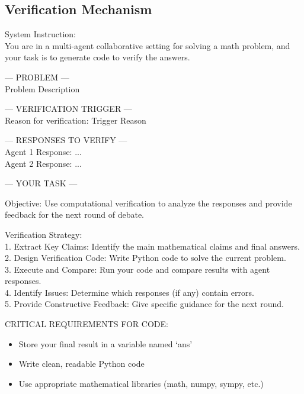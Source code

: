 \subsection{Verification Mechanism}
\label{app:prompt_verification}

\begin{tcolorbox}[
    breakable,
    colback=white,
    colframe=black,
    boxrule=0.8pt,
    left=6pt,
    right=6pt,
    top=6pt,
    bottom=6pt
]
\ttfamily\small
System Instruction:\\
You are in a multi-agent collaborative setting for solving a math problem, and your task is to generate code to verify the answers.

\vspace{0.5em}
--- PROBLEM --- \\
\lbrack Problem Description\rbrack

\vspace{0.5em}
--- VERIFICATION TRIGGER --- \\
Reason for verification: \lbrack Trigger Reason\rbrack

\vspace{0.5em}
--- RESPONSES TO VERIFY --- \\
Agent 1 Response: ...\\
Agent 2 Response: ...

\vspace{0.5em}
--- YOUR TASK ---

\vspace{0.25em}
Objective: Use computational verification to analyze the responses and provide feedback for the next round of debate.

\vspace{0.25em}
Verification Strategy:\\
1. Extract Key Claims: Identify the main mathematical claims and final answers.\\
2. Design Verification Code: Write Python code to solve the current problem.\\
3. Execute and Compare: Run your code and compare results with agent responses.\\
4. Identify Issues: Determine which responses (if any) contain errors.\\
5. Provide Constructive Feedback: Give specific guidance for the next round.

\vspace{0.5em}
CRITICAL REQUIREMENTS FOR CODE:
\begin{itemize}
    \item Store your final result in a variable named `ans'
    \item Write clean, readable Python code
    \item Use appropriate mathematical libraries (math, numpy, sympy, etc.)
\end{itemize}


\end{tcolorbox}
